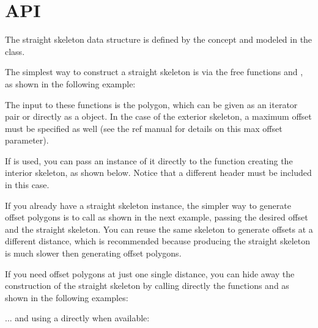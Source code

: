 \section{API}

The straight skeleton data structure is defined by the  concept and modeled in the  class.

The simplest way to construct a straight skeleton is via the free functions  and , as shown in the following example:


The input to these functions is the polygon, which can be given as an iterator pair or directly as a  object. In the case of the exterior skeleton, a maximum offset must be specified as well (see the ref manual for details on this max offset parameter).

If  is used, you can pass an instance of it directly to the function creating the interior skeleton, as shown below. Notice that a different header must be included in this case. 


If you already have a straight skeleton instance, the simpler way to generate offset polygons is to call  as shown in the next example, passing the desired offset and the straight skeleton. You can reuse the same skeleton to generate offsets at a different distance, which is recommended because producing the straight skeleton is much slower then generating offset polygons.


If you need offset polygons at just one single distance, you can hide away the construction of the straight skeleton by calling directly the functions  and  as shown in the following examples:


... and using a  directly when available:

